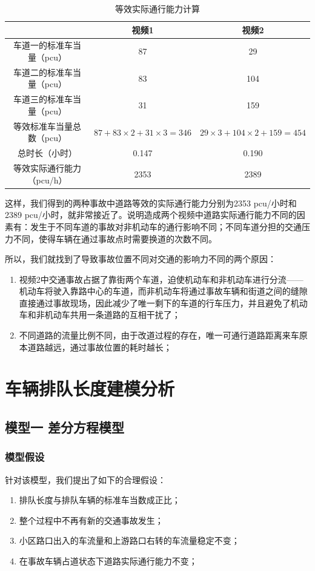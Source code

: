 \documentclass{cumcmart}
\begin{document}
\begin{table}[htbp]
\centering
\begin{tabular}{|c|c|c|}
\hline
 & 视频1& 视频2 \\
\hline
车道一的标准车当量（pcu）& 87& 29 \\
\hline
车道二的标准车当量（pcu）& 83& 104 \\
\hline
车道三的标准车当量（pcu）& 31& 159 \\
\hline
等效标准车当量总数（pcu）& $ {87+83\times 2+31\times 3=346}$& $ {29\times 3+104\times 2+159=454}$ \\
\hline
总时长（小时）& 0.147& 0.190 \\
\hline
等效实际通行能力（pcu/h）& 2353& 2389 \\
\hline
\end{tabular}
\label{tab11}
\caption{等效实际通行能力计算}
\end{table}

这样，我们得到的两种事故中道路等效的实际通行能力分别为2353 pcu/小时和2389
pcu/小时，就非常接近了。说明造成两个视频中道路实际通行能力不同的因素有：发生于不同车道的事故对非机动车的通行影响不同；不同车道分担的交通压力不同，使得车辆在通过事故点时需要换道的次数不同。

所以，我们就找到了导致事故位置不同对交通的影响力不同的两个原因：
\begin{enumerate}
\item 视频2中交通事故占据了靠街两个车道，迫使机动车和非机动车进行分流------机动车将驶入靠路中心的车道，而非机动车将通过事故车辆和街道之间的缝隙直接通过事故现场，因此减少了唯一剩下的车道的行车压力，并且避免了机动车和非机动车共用一条道路的互相干扰了；
\item 不同道路的流量比例不同，由于改道过程的存在，唯一可通行道路距离来车原本道路越远，通过事故位置的耗时越长；
\end{enumerate}


\section{车辆排队长度建模分析}

\subsection{模型一 差分方程模型}

\subsubsection{模型假设}
针对该模型，我们提出了如下的合理假设：
\begin{enumerate}
\item 排队长度与排队车辆的标准车当数成正比；
\item 整个过程中不再有新的交通事故发生；
\item 小区路口出入的车流量和上游路口右转的车流量稳定不变；
\item 在事故车辆占道状态下道路实际通行能力不变；
\end{enumerate}
\end{document}
